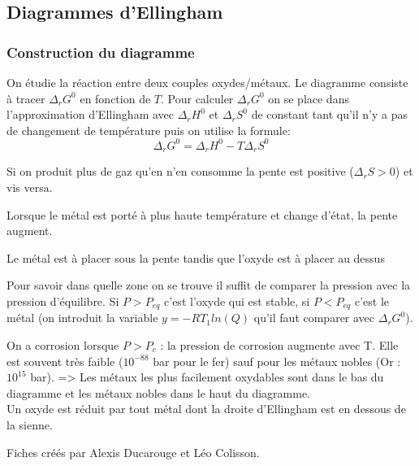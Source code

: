 \documentclass[9pt]{article}
\begin{document}
\begin{multicols*}{2}
\setlength{\columnseprule}{0.1pt}
\part{Diagrammes d'Ellingham}
\section{Construction du diagramme}
On étudie la réaction entre deux couples oxydes/métaux. Le diagramme consiste à tracer $\Delta_rG^0$ en fonction de $T$. Pour calculer $\Delta_rG^0$ on se place dans l'approximation d'Ellingham avec $\Delta_rH^0$ et $\Delta_rS^0$ de constant tant qu'il n'y a pas de changement de température puis on utilise la formule:
$$\Delta_rG^0 = \Delta_rH^0 - T\Delta_rS^0$$

Si on produit plus de gaz qu'en n'en consomme la pente est positive ($\Delta_rS > 0$) et vis versa.

Lorsque le métal est porté à plus haute température et change d'état, la pente augment.

Le métal est à placer sous la pente tandis que l'oxyde est à placer au dessus

Pour savoir dans quelle zone on se trouve il suffit de comparer la pression avec la pression d'équilibre. Si $P > P_{eq}$ c'est l'oxyde qui est stable, si $P < P_{eq}$ c'est le métal (on introduit la variable $y = -RT_1ln(Q)$ qu'il faut comparer avec $\Delta_rG^0$).

On a corrosion lorsque $P > P_c$ : la pression de corrosion augmente avec T. Elle est souvent très faible ($10^{-88}$ bar pour le fer) sauf pour les métaux nobles (Or : $10^{15}$ bar). => Les métaux les plus facilement oxydables sont dans le bas du diagramme et les métaux nobles dans le haut du diagramme.
\\


Un oxyde est réduit par tout métal dont la droite d'Ellingham est en dessous de la sienne.

\footnotesize{Fiches créés par Alexis Ducarouge et Léo Colisson.}

\end{multicols*}
\end{document}
